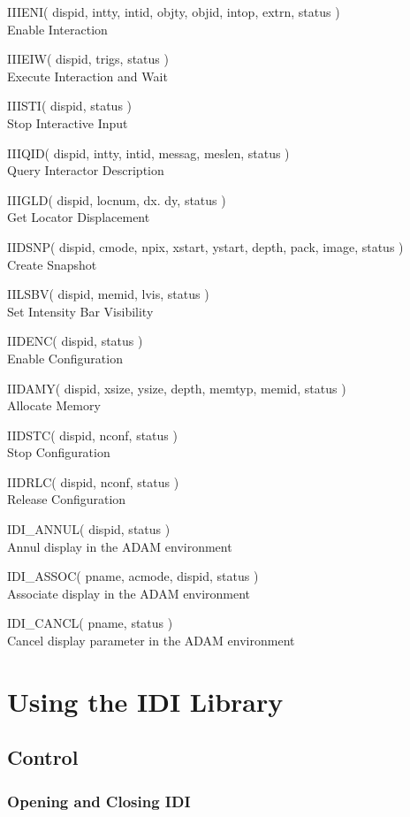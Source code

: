 \documentclass[11pt,nolof]{starlink}
\providecommand{\routinehead}[1]{\vspace{\bigskipamount}{\large\bf#1}}
\newenvironment{routinelist}{\begin{list}{}{\setlength{\leftmargin}{2cm}
                             \setlength{\parsep}{\smallskipamount}}}{\end{list}}
\providecommand{\noteroutine}[2]{\item\hspace{-1cm}#1#2\\}
\providecommand{\lnoteroutine}[2]{\item\hspace{-1cm}#1#2\\}
\begin{document}
\routinehead{Interaction}
\begin{routinelist}
\noteroutine{IIIENI}{( dispid, intty, intid, objty, objid, intop, extrn,
                        status )}
               {Enable Interaction}
\noteroutine{IIIEIW}{( dispid, trigs, status )}
               {Execute Interaction and Wait}
\noteroutine{IIISTI}{( dispid, status )}
               {Stop Interactive Input}
\noteroutine{IIIQID}{( dispid, intty, intid, messag, meslen, status )}
               {Query Interactor Description}
\noteroutine{IIIGLD}{( dispid, locnum, dx. dy, status )}
               {Get Locator Displacement}
\end{routinelist}
\routinehead{Miscellaneous routines}
\begin{routinelist}
\noteroutine{IIDSNP}{( dispid, cmode, npix, xstart, ystart, depth, pack, image,
                        status )}
               {Create Snapshot}
\noteroutine{IILSBV}{( dispid, memid, lvis, status )}
               {Set Intensity Bar Visibility}
\end{routinelist}
\routinehead{Workstation interface}
\begin{routinelist}
\noteroutine{IIDENC}{( dispid, status )}
               {Enable Configuration}
\noteroutine{IIDAMY}{( dispid, xsize, ysize, depth, memtyp, memid, status )}
               {Allocate Memory}
\noteroutine{IIDSTC}{( dispid, nconf, status )}
               {Stop Configuration}
\noteroutine{IIDRLC}{( dispid, nconf, status )}
               {Release Configuration}
\end{routinelist}
\routinehead{ADAM interface routines}
\begin{routinelist}
\lnoteroutine{IDI\_ANNUL}{( dispid, status )}
               {Annul display in the ADAM environment}
\lnoteroutine{IDI\_ASSOC}{( pname, acmode, dispid, status )}
               {Associate display in the ADAM environment}
\lnoteroutine{IDI\_CANCL}{( pname, status )}
               {Cancel display parameter in the ADAM environment}
\end{routinelist}

\section{Using the IDI Library}

\subsection{Control}

\subsubsection{Opening and Closing IDI}
\end{document}
